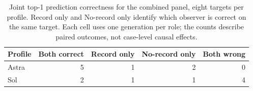 \begin{table}[htbp]
\centering\small
\begin{tabular}{lrrrr}\toprule
Profile & Both correct & Record only & No-record only & Both wrong\\\midrule
Astra & 5 & 1 & 2 & 0\\
Sol & 2 & 1 & 1 & 4\\
\bottomrule\end{tabular}
\caption{Joint top-1 prediction correctness for the combined panel, eight
targets per profile. Record only and No-record only identify which observer
is correct on the same target. Each cell uses one generation per role;
the counts describe paired outcomes, not case-level causal effects.}
\label{tab:prospective-paired}
\end{table}

